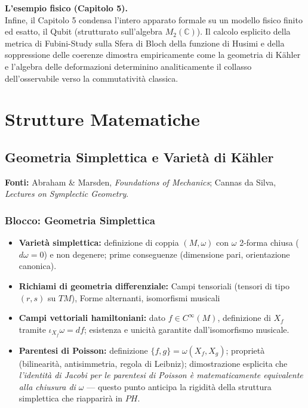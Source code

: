 \documentclass[12pt, a4paper]{article}
\newcommand{\fonti}[1]{%
	\begin{fontebox}
		\textcolor{fontecolor}{\footnotesize\textbf{Fonti:} #1}
	\end{fontebox}%
}
\begin{document}
	\medskip
	
	\textbf{L'esempio fisico (Capitolo 5).} \\
	Infine, il Capitolo 5 condensa l'intero apparato formale su un modello fisico finito ed esatto, il Qubit (strutturato sull'algebra $M_2(\mathbb{C})$). Il calcolo esplicito della metrica di Fubini-Study sulla Sfera di Bloch della funzione di Husimi e della soppressione delle coerenze dimostra empiricamente come la geometria di Kähler e l'algebra delle deformazioni determinino analiticamente il collasso dell'osservabile verso la commutatività classica.
	
	\newpage
	\section{Strutture Matematiche}
	
	\subsection{Geometria Simplettica e Varietà di Kähler}
	
	\fonti{Abraham \& Marsden, \textit{Foundations of Mechanics}; Cannas da Silva, \textit{Lectures on Symplectic Geometry}.}
	
	\subsubsection{Blocco: Geometria Simplettica}
	\begin{itemize}
		\item \textbf{Varietà simplettica:} definizione di coppia $(M, \omega)$ con $\omega$ 2-forma chiusa ($d\omega = 0$) e non degenere; prime conseguenze (dimensione pari, orientazione canonica).
		\item \textbf{Richiami di geometria differenziale:} Campi tensoriali (tensori di tipo $(r,s)$ su $TM$), 
		Forme alternanti, isomorfismi musicali
		\item \textbf{Campi vettoriali hamiltoniani:} dato $f \in C^\infty(M)$, definizione di $X_f$ tramite $\iota_{X_f}\omega = df$; esistenza e unicità garantite dall'isomorfismo musicale.
		\item \textbf{Parentesi di Poisson:} definizione $\{f,g\} = \omega(X_f, X_g)$; proprietà (bilinearità, antisimmetria, regola di Leibniz); dimostrazione esplicita che \emph{l'identità di Jacobi per le parentesi di Poisson è matematicamente equivalente alla chiusura di $\omega$} --- questo punto anticipa la rigidità della struttura simplettica che riapparirà in $PH$.
	\end{itemize}
	
\end{document}
